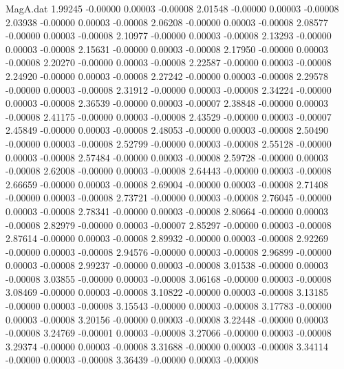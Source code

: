 \begin{filecontents}{MagA.dat}
   1.99245   -0.00000    0.00003   -0.00008
   2.01548   -0.00000    0.00003   -0.00008
   2.03938   -0.00000    0.00003   -0.00008
   2.06208   -0.00000    0.00003   -0.00008
   2.08577   -0.00000    0.00003   -0.00008
   2.10977   -0.00000    0.00003   -0.00008
   2.13293   -0.00000    0.00003   -0.00008
   2.15631   -0.00000    0.00003   -0.00008
   2.17950   -0.00000    0.00003   -0.00008
   2.20270   -0.00000    0.00003   -0.00008
   2.22587   -0.00000    0.00003   -0.00008
   2.24920   -0.00000    0.00003   -0.00008
   2.27242   -0.00000    0.00003   -0.00008
   2.29578   -0.00000    0.00003   -0.00008
   2.31912   -0.00000    0.00003   -0.00008
   2.34224   -0.00000    0.00003   -0.00008
   2.36539   -0.00000    0.00003   -0.00007
   2.38848   -0.00000    0.00003   -0.00008
   2.41175   -0.00000    0.00003   -0.00008
   2.43529   -0.00000    0.00003   -0.00007
   2.45849   -0.00000    0.00003   -0.00008
   2.48053   -0.00000    0.00003   -0.00008
   2.50490   -0.00000    0.00003   -0.00008
   2.52799   -0.00000    0.00003   -0.00008
   2.55128   -0.00000    0.00003   -0.00008
   2.57484   -0.00000    0.00003   -0.00008
   2.59728   -0.00000    0.00003   -0.00008
   2.62008   -0.00000    0.00003   -0.00008
   2.64443   -0.00000    0.00003   -0.00008
   2.66659   -0.00000    0.00003   -0.00008
   2.69004   -0.00000    0.00003   -0.00008
   2.71408   -0.00000    0.00003   -0.00008
   2.73721   -0.00000    0.00003   -0.00008
   2.76045   -0.00000    0.00003   -0.00008
   2.78341   -0.00000    0.00003   -0.00008
   2.80664   -0.00000    0.00003   -0.00008
   2.82979   -0.00000    0.00003   -0.00007
   2.85297   -0.00000    0.00003   -0.00008
   2.87614   -0.00000    0.00003   -0.00008
   2.89932   -0.00000    0.00003   -0.00008
   2.92269   -0.00000    0.00003   -0.00008
   2.94576   -0.00000    0.00003   -0.00008
   2.96899   -0.00000    0.00003   -0.00008
   2.99237   -0.00000    0.00003   -0.00008
   3.01538   -0.00000    0.00003   -0.00008
   3.03855   -0.00000    0.00003   -0.00008
   3.06168   -0.00000    0.00003   -0.00008
   3.08469   -0.00000    0.00003   -0.00008
   3.10822   -0.00000    0.00003   -0.00008
   3.13185   -0.00000    0.00003   -0.00008
   3.15543   -0.00000    0.00003   -0.00008
   3.17783   -0.00000    0.00003   -0.00008
   3.20156   -0.00000    0.00003   -0.00008
   3.22448   -0.00000    0.00003   -0.00008
   3.24769   -0.00001    0.00003   -0.00008
   3.27066   -0.00000    0.00003   -0.00008
   3.29374   -0.00000    0.00003   -0.00008
   3.31688   -0.00000    0.00003   -0.00008
   3.34114   -0.00000    0.00003   -0.00008
   3.36439   -0.00000    0.00003   -0.00008

\end{filecontents}
